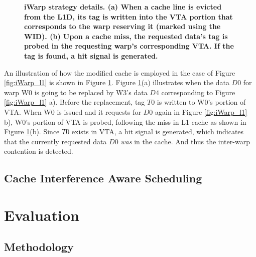 \documentclass{sigplanconf}
\begin{document}
\begin{figure}
\begin{center}
\end{center}
\vspace{-10pt}
\caption{\textbf{iWarp strategy details. (a) When a cache line is evicted from the L1D, its tag is written into the VTA portion that corresponds to the warp reserving it (marked using the WID). (b) Upon a cache miss, the requested data's tag is probed in the requesting warp's corresponding VTA. If the tag is found, a hit signal is generated. \label{fig:vta_ex}}}
\vspace{-15pt}
\end{figure}

An illustration of how the modified cache is employed in the case of Figure \ref{fig:iWarp_l1} is shown in Figure \ref{fig:vta_ex}. Figure \ref{fig:vta_ex}(a) illustrates when the data $D0$ for warp W0 is going to be replaced by W3's data $D4$ corresponding to Figure \ref{fig:iWarp_l1} a). Before the replacement, tag $T0$ is written to W0's portion of VTA. When W0 is issued and it requests for $D0$ again in Figure \ref{fig:iWarp_l1} b), W0's portion of VTA is probed, following the miss in L1 cache as shown in Figure \ref{fig:vta_ex}(b). Since $T0$ exists in VTA, a hit signal is generated, which indicates that the currently requested data $D0$ \textit{was} in the cache. And thus the inter-warp contention is detected.


\subsection{Cache Interference Aware Scheduling}



\section{Evaluation}


\subsection{Methodology}
\label{sec:method}
\end{document}
